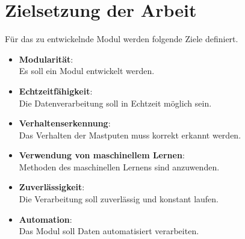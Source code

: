 \section{Zielsetzung der Arbeit} \label{sec:Zielsetzung}
Für das zu entwickelnde Modul werden folgende Ziele definiert.

\begin{itemize}
    \item \textbf{Modularität}: \\
    Es soll ein Modul entwickelt werden. 
    \item \textbf{Echtzeitfähigkeit}: \\
    Die Datenverarbeitung soll in Echtzeit möglich sein.
    \item \textbf{Verhaltenserkennung}: \\
    Das Verhalten der Mastputen muss korrekt erkannt werden.
    \item \textbf{Verwendung von maschinellem Lernen}: \\
    Methoden des maschinellen Lernens sind anzuwenden.
    \item \textbf{Zuverlässigkeit}: \\
    Die Verarbeitung soll zuverlässig und konstant laufen.
    \item \textbf{Automation}: \\
    Das Modul soll Daten automatisiert verarbeiten. 
\end{itemize}